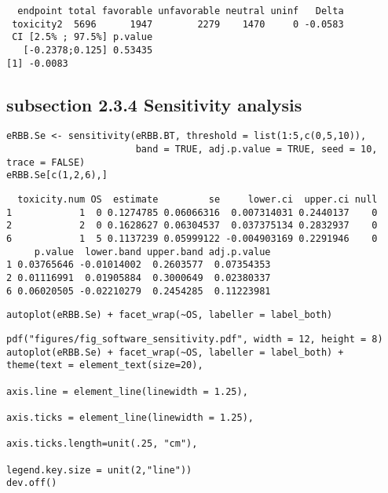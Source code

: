 \documentclass[12pt]{article}
\begin{document}
\begin{verbatim}
  endpoint total favorable unfavorable neutral uninf   Delta
 toxicity2  5696      1947        2279    1470     0 -0.0583
 CI [2.5% ; 97.5%] p.value
   [-0.2378;0.125] 0.53435
[1] -0.0083
\end{verbatim}

\subsection{subsection 2.3.4 Sensitivity analysis}
\label{sec:org87dbfff}

\lstset{language=r,label= ,caption= ,captionpos=b,numbers=none}
\begin{lstlisting}
eRBB.Se <- sensitivity(eRBB.BT, threshold = list(1:5,c(0,5,10)),
                       band = TRUE, adj.p.value = TRUE, seed = 10, trace = FALSE)
eRBB.Se[c(1,2,6),]
\end{lstlisting}

\begin{verbatim}
  toxicity.num OS  estimate         se     lower.ci  upper.ci null
1            1  0 0.1274785 0.06066316  0.007314031 0.2440137    0
2            2  0 0.1628627 0.06304537  0.037375134 0.2832937    0
6            1  5 0.1137239 0.05999122 -0.004903169 0.2291946    0
     p.value  lower.band upper.band adj.p.value
1 0.03765646 -0.01014002  0.2603577  0.07354353
2 0.01116991  0.01905884  0.3000649  0.02380337
6 0.06020505 -0.02210279  0.2454285  0.11223981
\end{verbatim}


\lstset{language=r,label= ,caption= ,captionpos=b,numbers=none}
\begin{lstlisting}
autoplot(eRBB.Se) + facet_wrap(~OS, labeller = label_both)
\end{lstlisting}

\lstset{language=r,label= ,caption= ,captionpos=b,numbers=none}
\begin{lstlisting}
pdf("figures/fig_software_sensitivity.pdf", width = 12, height = 8)
autoplot(eRBB.Se) + facet_wrap(~OS, labeller = label_both) + theme(text = element_text(size=20), 
                                                                   axis.line = element_line(linewidth = 1.25),
                                                                   axis.ticks = element_line(linewidth = 1.25),
                                                                   axis.ticks.length=unit(.25, "cm"),
                                                                   legend.key.size = unit(2,"line"))
dev.off()
\end{lstlisting}
\end{document}
